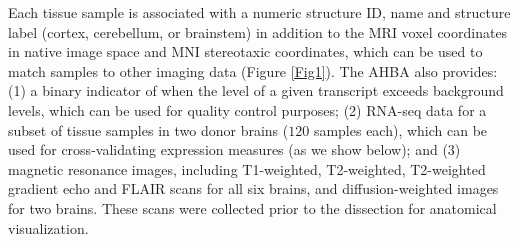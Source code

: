 \documentclass[10pt,A4]{article}
\begin{document}
Each tissue sample is associated with a numeric structure ID, name and structure label (cortex, cerebellum, or brainstem) in addition to the MRI voxel coordinates in native image space and MNI stereotaxic coordinates, which can be used to match samples to other imaging data (Figure \ref{Fig1}). The AHBA also provides: (1) a binary indicator of when the level of a given transcript exceeds background levels, which can be used for quality control purposes; (2) RNA-seq data for a subset of tissue samples in two donor brains ($120$ samples each), which can be used for cross-validating expression measures (as we show below); and (3) magnetic resonance images, including T1-weighted, T2-weighted, T2-weighted gradient echo and FLAIR scans for all six brains, and diffusion-weighted images for two brains. These scans were collected prior to the dissection for anatomical visualization.
\end{document}

